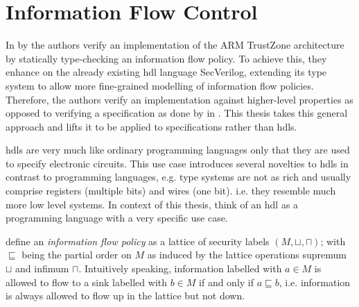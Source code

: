 \section{Information Flow Control}
\label{sec:bg-ifc}

In  \cite{Ferraiuolo17} by \citeauthor{Ferraiuolo17} the authors verify an implementation of the ARM TrustZone architecture by statically type-checking an information flow policy.
To achieve this, they enhance on the already existing \gls{hdl} language SecVerilog, extending its type system to allow more fine-grained modelling of information flow policies.
Therefore, the authors verify an implementation against higher-level properties as opposed to verifying a specification as done by \citeauthor{Reid17} in \cite{Reid17}.
This thesis takes this general approach and lifts it to be applied to specifications rather than \glspl{hdl}.

\glspl{hdl} are very much like ordinary programming languages only that they are used to specify electronic circuits.
This use case introduces several novelties to \glspl{hdl} in contrast to programming languages, e.g. type systems are not as rich and usually comprise registers (multiple bits) and wires (one bit). i.e. they resemble much more low level systems.
In context of this thesis, think of an \gls{hdl} as a programming language with a very specific use case.

\citeauthor{Ferraiuolo17} define an \textit{information flow policy} as a lattice of security labels $ (M, \sqcup, \sqcap) $; with $ \sqsubseteq $ being the partial order on $ M $ as induced by the lattice operations supremum $ \sqcup $ and infimum $ \sqcap $.
Intuitively speaking, information labelled with $ a \in M $ is allowed to flow to a sink labelled with $ b \in M $ if and only if $ a \sqsubseteq b $, i.e. information is always allowed to flow up in the lattice but not down.

